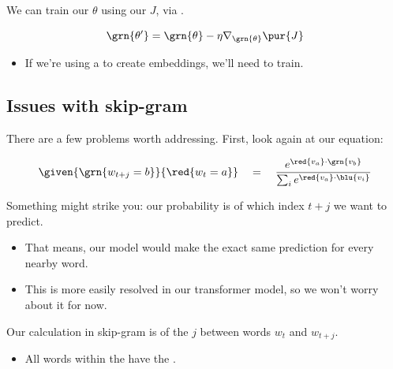         \begin{concept}
            We can train our  $\theta$ using our  $J$, via .

            \begin{equation*}
                \grn{\theta'} = \grn{\theta} - \eta \nabla_{\grn{\theta}}\pur{J}
            \end{equation*}

            \begin{itemize}
                \item If we're using a  to create embeddings, we'll need \phantom{fillertonextline}  to train.
            \end{itemize}
        \end{concept}




    \pagebreak




    \subsection{Issues with skip-gram}

        There are a few problems worth addressing. First, look again at our equation:

        \begin{equation*}
                \given{ \grn{w_{t+j} = b} }{ \red{w_t=a} } 
                \quad=\quad
                \frac{e^{\red{v_a} \cdot \grn{v_b}} }{ \sum_i e^{\red{v_a} \cdot \blu{v_i} }}
        \end{equation*}

        Something might strike you: our probability is  of which index $t+j$ we want to predict.

        \begin{itemize}
            \item That means, our model would make the exact same prediction for every nearby word.
            \item This is more easily resolved in our transformer model, so we won't worry about it for now.\\
        \end{itemize}

        \begin{concept}
            Our  calculation in skip-gram is  of the  $j$ between words $w_t$ and $w_{t+j}$.

            \begin{itemize}
                \item All words within the  have the .
            \end{itemize}
        \end{concept}


